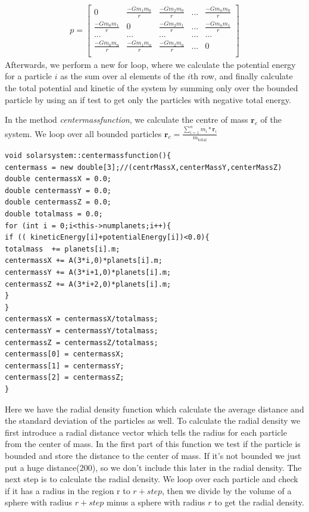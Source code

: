\documentclass[10pt,a4paper]{article}
\begin{document}
\begin{align}
p=
\begin{bmatrix}
0 & \frac{-Gm_1m_0}{r} & \frac{-Gm_2m_0}{r} & ... & \frac{-Gm_nm_0}{r}  \\
\frac{-Gm_0m_1}{r} & 0 & \frac{-Gm_2m_1}{r} & ... & \frac{-Gm_nm_1}{r}  \\
... & ... & ... & ... & ... \\
\frac{-Gm_0m_n}{r} & \frac{-Gm_1m_n}{r} & \frac{-Gm_2m_n}{r} & ... & 0  \\
\end{bmatrix}
\end{align} 
Afterwards, we perform a new for loop, where we calculate the potential energy for a particle $i$ as the sum over al elements of the $i$th row, and finally calculate the total potential and kinetic of the system by summing only over the bounded particle by using an if test to get only the particles with negative total energy.

In the method \emph{centermassfunction}, we calculate the centre of mass $\mathbf{r}_c$ of the system. We loop over all bounded particles $\mathbf{r}_c = \frac{\sum\limits_{i=1}^n m_i*\mathbf{r}_i}{m_\mathrm{total}}$
\begin{lstlisting} 
void solarsystem::centermassfunction(){
centermass = new double[3];//(centrMassX,centerMassY,centerMassZ)
double centermassX = 0.0;
double centermassY = 0.0;
double centermassZ = 0.0;
double totalmass = 0.0;
for (int i = 0;i<this->numplanets;i++){
if (( kineticEnergy[i]+potentialEnergy[i])<0.0){
totalmass  += planets[i].m;
centermassX += A(3*i,0)*planets[i].m;
centermassY += A(3*i+1,0)*planets[i].m;
centermassZ += A(3*i+2,0)*planets[i].m;
}
}
centermassX = centermassX/totalmass;
centermassY = centermassY/totalmass;
centermassZ = centermassZ/totalmass;
centermass[0] = centermassX;
centermass[1] = centermassY;
centermass[2] = centermassZ;
}
\end{lstlisting}


Here we have the radial density function which calculate the average distance and the standard deviation of the particles as well. To calculate the radial density we first introduce a radial distance vector which tells the radius for each particle from the center of mass. In the first part of this function we test if the particle is bounded and store the distance to the center of mass. If it's not bounded we just put a huge distance(200), so we don't include this later in the radial density. The next step is to calculate the radial density. We loop over each particle and check if it has a radius in the region r to $r + step$, then we divide by the volume of a sphere with radius $r + step$ minus a sphere with radius $r$ to get the radial density.  
     
\end{document}
